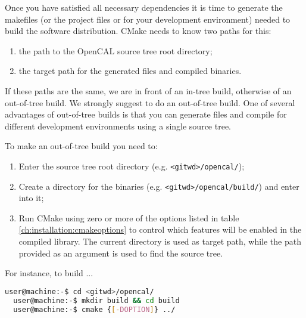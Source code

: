 Once you have satisfied all necessary dependencies it is time to
generate the makefiles (or the project files or for your development
environment) needed to build the software distribution. CMake needs to
know two paths for this:
\begin{enumerate}
\item the path to the OpenCAL source tree root directory;
\item the target path for the generated files and compiled binaries.
\end{enumerate}

If these paths are the same, we are in front of an in-tree build,
otherwise of an out-of-tree build. We strongly suggest to do an
out-of-tree build. One of several advantages of out-of-tree builds is
that you can generate files and compile for different development
environments using a single source tree.

To make an out-of-tree build you need to:
\begin{enumerate}
\item Enter the source tree root directory (e.g. \verb'<gitwd>/opencal/');
\item Create a directory for the binaries
  (e.g. \verb'<gitwd>/opencal/build/') and enter into it;
\item Run CMake using zero or more of the options listed in table
  \ref{ch:installation:cmakeoptions} to control which features will be
  enabled in the compiled library. The current directory is used as
  target path, while the path provided as an argument is used to find
  the source tree.
\end{enumerate}

For instance, to build ... 

\begin{lstlisting}[numbers=none,language=bash,label={ch:quickstart:simplebuild}]
  user@machine:-$ cd <gitwd>/opencal/
  user@machine:-$ mkdir build && cd build
  user@machine:-$ cmake {[-DOPTION]} ../
\end{lstlisting}



